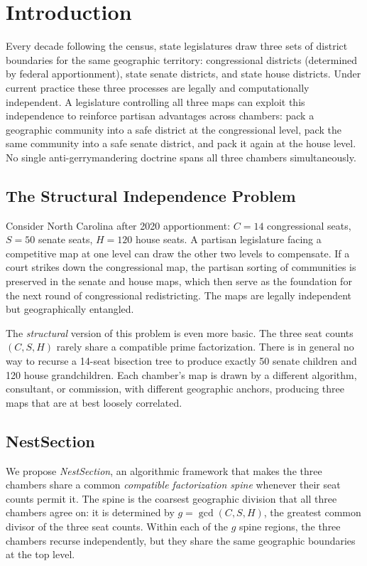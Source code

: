 \section{Introduction}
\label{sec:intro}

Every decade following the census, state legislatures draw three sets of
district boundaries for the same geographic territory: congressional districts
(determined by federal apportionment), state senate districts, and state house
districts.  Under current practice these three processes are legally and
computationally independent.  A legislature controlling all three maps can
exploit this independence to reinforce partisan advantages across chambers: pack
a geographic community into a safe district at the congressional level, pack the
same community into a safe senate district, and pack it again at the house
level.  No single anti-gerrymandering doctrine spans all three chambers
simultaneously.

\subsection{The Structural Independence Problem}

Consider North Carolina after 2020 apportionment: $C = 14$ congressional
seats, $S = 50$ senate seats, $H = 120$ house seats.  A partisan legislature
facing a competitive map at one level can draw the other two levels to
compensate.  If a court strikes down the congressional map, the partisan sorting
of communities is preserved in the senate and house maps, which then serve as
the foundation for the next round of congressional redistricting.  The maps are
legally independent but geographically entangled.

The \emph{structural} version of this problem is even more basic.  The three
seat counts $(C, S, H)$ rarely share a compatible prime factorization.  There is
in general no way to recurse a 14-seat bisection tree to produce exactly 50
senate children and 120 house grandchildren.  Each chamber's map is drawn by a
different algorithm, consultant, or commission, with different geographic
anchors, producing three maps that are at best loosely correlated.

\subsection{NestSection}

We propose \emph{NestSection}, an algorithmic framework that makes the three
chambers share a common \emph{compatible factorization spine} whenever their
seat counts permit it.  The spine is the
coarsest geographic division that all three chambers agree on: it is
determined by $g = \gcd(C, S, H)$, the greatest common divisor of the three
seat counts.  Within each of the $g$ spine regions, the three chambers recurse
independently, but they share the same geographic boundaries at the top level.

